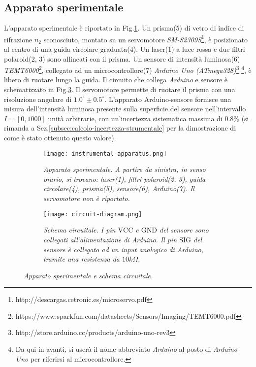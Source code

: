 \subsection{Apparato sperimentale}\label{subsec:apparato-sperimentale}
  L’apparato sperimentale è riportato in Fig.\ref{fig:apparato-strumentale}.
  Un prisma(5) di vetro di indice di rifrazione $n_2$ sconosciuto, montato su un servomotore \emph{SM-S2309S}\footnote{http://descargas.cetronic.es/microservo.pdf}, è posizionato al centro di una guida circolare graduata(4).
  Un laser(1) a luce rossa e due filtri polaroid(2, 3) sono
  allineati con il prisma. Un sensore di intensità luminosa(6) \emph{TEMT6000}\footnote{https://www.sparkfun.com/datasheets/Sensors/Imaging/TEMT6000.pdf},
  collegato ad un microcontrollore(7) \emph{Arduino Uno (ATmega328)}\footnote{http://store.arduino.cc/products/arduino-uno-rev3}%
  \footnote{Da qui in avanti, si userà il nome abbreviato \emph{Arduino} al posto di \emph{Arduino Uno} per riferirsi al microcontrollore.},
  è libero di ruotare lungo la guida.
  Il circuito che collega \emph{Arduino} e sensore è schematizzato in Fig.\ref{fig:diagramma-circuito}.
  Il servomotore permette di ruotare il prisma con una risoluzione angolare di ${1.0^\circ \pm 0.5^\circ}$.
  L'apparato Arduino-sensore fornisce una misura dell'intensità luminosa presente
  sulla superficie del sensore nell'intervallo $I = [0, 1000]$ unità arbitrarie,
  con un'incertezza sistematica massima di $0.8\%$ (si rimanda a Sez.\ref{subsec:calcolo-incertezza-strumentale}
  per la dimostrazione di come è stato ottenuto questo valore).
%
  \begin{figure}[h]
    \centering
    \begin{subfigure}{.47\textwidth}
      \texttt{[image: instrumental-apparatus.png]}
      \caption{
        \emph{
          Apparato sperimentale. A partire da sinistra, in senso orario,
          si trovano: laser(1), filtri polaroid(2, 3), guida circolare(4),
          prisma(5), sensore(6), Arduino(7). Il servomotore non è riportato.
        }
      }
      \label{fig:apparato-strumentale}
    \end{subfigure}%
    \hspace{5mm}
    \begin{subfigure}{.47\textwidth}
      \texttt{[image: circuit-diagram.png]}
      \caption{
        \emph{
          Schema circuitale. I pin $\text{VCC}$ e $\text{GND}$ del sensore sono collegati
          all'alimentazione di Arduino. Il pin $\text{SIG}$
          del sensore è collegato ad un input analogico di Arduino, tramite una
          resistenza da $10k\Omega$.
        }
      }
      \label{fig:diagramma-circuito}
    \end{subfigure}
    \caption{\emph{Apparato sperimentale e schema circuitale.}}
  \end{figure}
%
